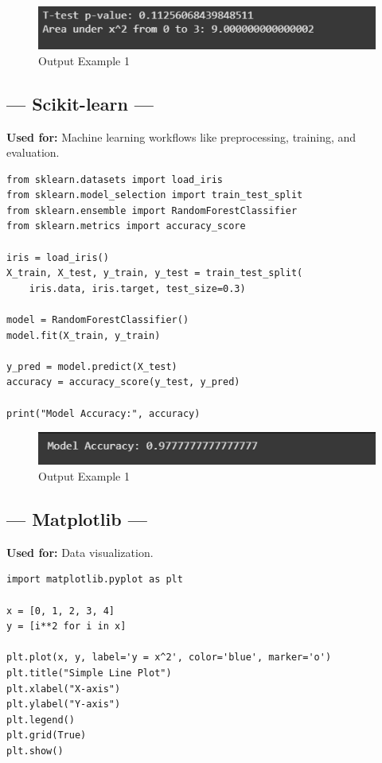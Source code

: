 \documentclass[11pt]{article}
\begin{document}
\begin{figure}[H]
    \centering
    \includegraphics[width=0.8\linewidth]{ml3.png}
    \caption{Output Example 1}
    \label{fig:output1}
\end{figure}

\subsection*{--- Scikit-learn ---}
\textbf{Used for:} Machine learning workflows like preprocessing, training, and evaluation.
\begin{lstlisting}
from sklearn.datasets import load_iris
from sklearn.model_selection import train_test_split
from sklearn.ensemble import RandomForestClassifier
from sklearn.metrics import accuracy_score

iris = load_iris()
X_train, X_test, y_train, y_test = train_test_split(
    iris.data, iris.target, test_size=0.3)

model = RandomForestClassifier()
model.fit(X_train, y_train)

y_pred = model.predict(X_test)
accuracy = accuracy_score(y_test, y_pred)

print("Model Accuracy:", accuracy)
\end{lstlisting}

\begin{figure}[H]
    \centering
    \includegraphics[width=0.8\linewidth]{ml4.png}
    \caption{Output Example 1}
    \label{fig:output1}
\end{figure}

\subsection*{--- Matplotlib ---}
\textbf{Used for:} Data visualization.
\begin{lstlisting}
import matplotlib.pyplot as plt

x = [0, 1, 2, 3, 4]
y = [i**2 for i in x]

plt.plot(x, y, label='y = x^2', color='blue', marker='o')
plt.title("Simple Line Plot")
plt.xlabel("X-axis")
plt.ylabel("Y-axis")
plt.legend()
plt.grid(True)
plt.show()
\end{lstlisting}
\end{document}
